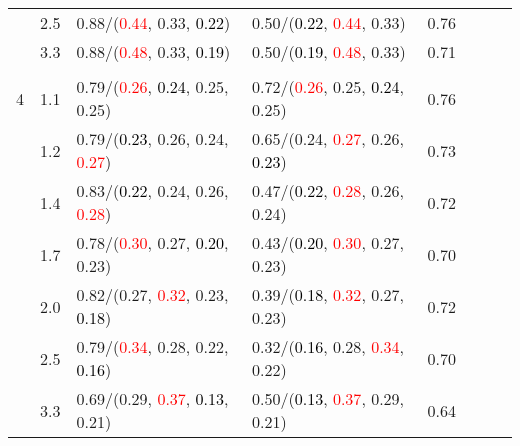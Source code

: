 \documentclass[10pt,a4paper]{report}
\begin{document}
\begin{table}[!htbp]
\begin{center}
{\begin{tabular}{ccllcccc}
			&2.5&0.88/(\textcolor{red}{0.44}, 0.33, \textcolor{black}{0.22})&0.50/(\textcolor{black}{0.22}, \textcolor{red}{0.44}, 0.33)&0.76\\
			&3.3&0.88/(\textcolor{red}{0.48}, 0.33, \textcolor{black}{0.19})&0.50/(\textcolor{black}{0.19}, \textcolor{red}{0.48}, 0.33)&0.71\\
			&&&&\\
			4			&1.1&0.79/(\textcolor{red}{0.26}, \textcolor{black}{0.24}, 0.25, 0.25)&0.72/(\textcolor{red}{0.26}, 0.25, \textcolor{black}{0.24}, 0.25)&0.76\\
			&1.2&0.79/(\textcolor{black}{0.23}, 0.26, 0.24, \textcolor{red}{0.27})&0.65/(0.24, \textcolor{red}{0.27}, 0.26, \textcolor{black}{0.23})&0.73\\
			&1.4&0.83/(\textcolor{black}{0.22}, 0.24, 0.26, \textcolor{red}{0.28})&0.47/(\textcolor{black}{0.22}, \textcolor{red}{0.28}, 0.26, 0.24)&0.72\\
			&1.7&0.78/(\textcolor{red}{0.30}, 0.27, \textcolor{black}{0.20}, 0.23)&0.43/(\textcolor{black}{0.20}, \textcolor{red}{0.30}, 0.27, 0.23)&0.70\\
			&2.0&0.82/(0.27, \textcolor{red}{0.32}, 0.23, \textcolor{black}{0.18})&0.39/(\textcolor{black}{0.18}, \textcolor{red}{0.32}, 0.27, 0.23)&0.72\\
			&2.5&0.79/(\textcolor{red}{0.34}, 0.28, 0.22, \textcolor{black}{0.16})&0.32/(\textcolor{black}{0.16}, 0.28, \textcolor{red}{0.34}, 0.22)&0.70\\
			&3.3&0.69/(0.29, \textcolor{red}{0.37}, \textcolor{black}{0.13}, 0.21)&0.50/(\textcolor{black}{0.13}, \textcolor{red}{0.37}, 0.29, 0.21)&0.64\\
			\bottomrule
		\end{tabular}}
	\end{center}
\end{table}
\end{document}
